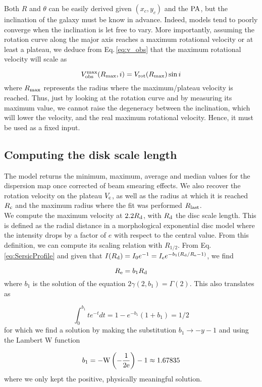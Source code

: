 Both $R$ and $\theta$  can be easily derived given $(x_c , y_c)$ and the $\rm{PA}$, but the inclination of the galaxy must be know in advance. Indeed, models tend to poorly converge when the inclination is let free to vary. More importantly, assuming the rotation curve along the major axis reaches a maximum rotational velocity or at least a plateau, we deduce from Eq.\,\ref{eq:v_obs} that the maximum rotational velocity will scale as

\begin{equation}
	V_{\rm{obs}}^{\rm{max}} (R_{\rm{max}}, i) = V_{\rm{rot}} (R_{\rm{max}}) \sin i
\end{equation}
where $R_{\rm{max}}$ represents the radius where the maximum/plateau velocity is reached. Thus, just by looking at the rotation curve and by measuring its maximum value, we cannot raise the degeneracy between the inclination, which will lower the velocity, and the real maximum rotational velocity. Hence, it must be used as a fixed input.

\subsection{Computing the disk scale length}
\label{sec:disk_scale_length}

The model returns the minimum, maximum, average and median values for the dispersion map once corrected of beam smearing effects. We also recover the rotation velocity on the plateau $V_{\rm{c}}$, as well as the radius at which it is reached $R_{\rm{c}}$ and the maximum radius where the fit was performed $R_{\rm{last}}$.\\

We compute the maximum velocity at $2.2 R_{\rm{d}}$, with $R_{\rm{d}}$ the disc scale length. This is defined as the radial distance in a morphological exponential disc model where the intensity drops by a factor of $e$ with respect to the central value. From this definition, we can compute its scaling relation with $R_{1/2}$. From Eq.\,\ref{eq:SersicProfile} and given that $I(R_{\rm{d}}) = I_0 e^{-1} = I_{\rm{e}} e^{- b_1 ( R_{\rm{d}} / R_{\rm{e}} - 1 )}$, we find

\begin{equation}
	R_{\rm{e}} = b_1 R_{\rm{d}}
\end{equation}
where $b_1$ is the solution of the equation $2 \gamma (2, b_1) = \Gamma(2)$. This also translates as

\begin{equation}
	\int_0^{b_1} t e^{-t} dt = 1 - e^{-b_1} ( 1 + b_1) = 1/2
\end{equation}
for which we find a solution by making the substitution $b_1 \rightarrow - y - 1$ and using the Lambert W function

\begin{equation}
	b_1 = - \rm{W} \left ( - \frac{1}{2 e} \right ) - 1 \approx 1.67835
\end{equation}
where we only kept the positive, physically meaningful solution. 